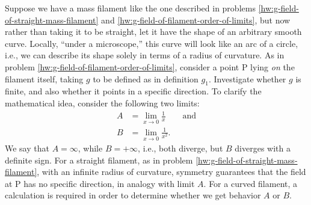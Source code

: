 Suppose we have a mass filament like the one described in problems
\ref{hw:g-field-of-straight-mass-filament} and \ref{hw:g-field-of-filament-order-of-limits}, but now rather than taking it to be
straight, let it have the shape of an arbitrary smooth curve. Locally, ``under a
microscope,'' this curve will look like an arc of a circle, i.e., we can describe its
shape solely in terms of a radius of curvature. 
As in problem \ref{hw:g-field-of-filament-order-of-limits},
consider a point P lying \emph{on} the filament itself, taking $g$ to be defined as in definition $g_1$.
Investigate whether $g$ is finite, and also whether it points in a specific direction. To clarify the
mathematical idea, consider the following two limits:
\begin{align*}
  A &=\lim_{x\rightarrow0} \frac{1}{x} \qquad \text{and}\\
  B &=\lim_{x\rightarrow0} \frac{1}{x^2}. 
\end{align*}
We say that $A=\infty$, while $B=+\infty$, i.e., both diverge, but $B$ diverges with a definite sign. 
For a straight filament,
as in problem \ref{hw:g-field-of-straight-mass-filament}, with an infinite radius of
curvature, symmetry guarantees that the field at P has no specific direction, in analogy with limit $A$.
For a curved filament, a calculation is required in order to determine whether we get behavior $A$ or $B$.
